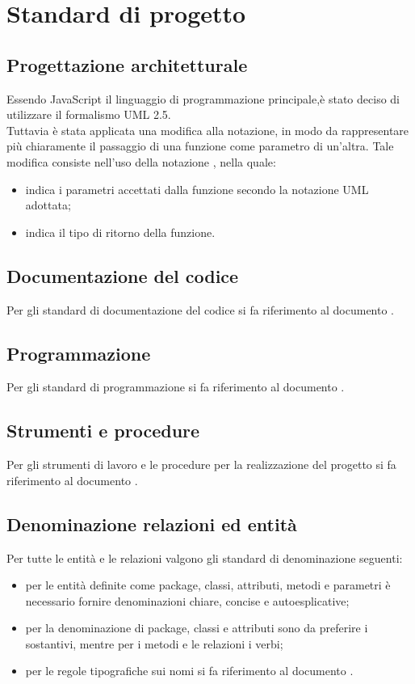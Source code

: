 \section{Standard di progetto}
\subsection{Progettazione architetturale}
Essendo JavaScript il linguaggio di programmazione principale,è stato 
deciso di utilizzare il formalismo UML 2.5. \\
Tuttavia è stata applicata una modifica alla notazione, in modo da rappresentare più chiaramente il passaggio di una funzione come parametro di un'altra.
Tale modifica consiste nell’uso della notazione , nella quale:
\begin{itemize}
	\item {} indica i parametri accettati dalla funzione secondo la notazione UML adottata;
	\item {} indica il tipo di ritorno della funzione.
\end{itemize}
\subsection{Documentazione del codice}
Per gli standard di documentazione del codice si fa riferimento al documento \NPdoc.
\subsection{Programmazione}
Per gli standard di programmazione si fa riferimento al documento \NPdoc.
\subsection{Strumenti e procedure}
Per gli strumenti di lavoro e le procedure per la realizzazione del progetto si fa riferimento al documento \NPdoc.
\subsection{Denominazione relazioni ed entità}
Per tutte le entità e le relazioni valgono gli standard di denominazione seguenti:
\begin{itemize}
	\item per le entità definite come package, classi, attributi, metodi e parametri è necessario fornire denominazioni chiare, concise e autoesplicative;
	\item per la denominazione di package, classi e attributi sono da preferire i sostantivi, mentre per i metodi e le relazioni i verbi;
	\item per le regole tipografiche sui nomi si fa riferimento al documento \NPdoc.
\end{itemize}